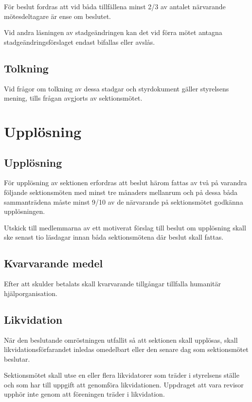 \documentclass{datateknologsektionen-document}
\begin{document}
För beslut fordras att vid båda tillfällena minst 2/3 av antalet närvarande mötesdeltagare
är ense om beslutet.

Vid andra läsningen av stadgeändringen kan det vid förra mötet antagna
stadgeändringsförslaget endast bifallas eller avslås.

\subsection{Tolkning}
Vid frågor om tolkning av dessa stadgar och styrdokument gäller styrelsens mening, tills frågan avgjorts av
sektionsmötet.

\section{Upplösning}
\subsection{Upplösning}
För upplösning av sektionen erfordras att beslut härom fattas av två på varandra följande
sektionsmöten med minst tre månaders mellanrum och på dessa båda sammanträdena
måste minst 9/10 av de närvarande på sektionsmötet godkänna upplösningen.

Utskick till medlemmarna av ett motiverat förslag till beslut om upplösning skall ske
senast tio läsdagar innan båda sektionsmötena där beslut skall fattas.

\subsection{Kvarvarande medel}
Efter att skulder betalats skall kvarvarande tillgångar tillfalla humanitär
hjälporganisation.

\subsection{Likvidation}
När den beslutande omröstningen utfallit så att sektionen skall upplösas, skall
likvidationsförfarandet inledas omedelbart eller den senare dag som sektionsmötet
beslutar.

Sektionsmötet skall utse en eller flera likvidatorer som träder i styrelsens ställe och som
har till uppgift att genomföra likvidationen. Uppdraget att vara revisor upphör inte genom
att föreningen träder i likvidation.
\end{document}
